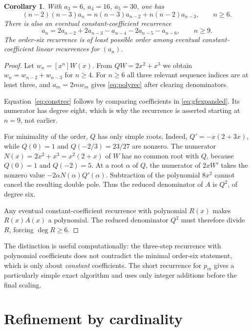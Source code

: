 \documentclass[11pt,letterpaper]{article}
\numberwithin{equation}{section}
\newtheorem{corollary}[theorem]{Corollary}
\theoremstyle{definition}
\theoremstyle{remark}
\begin{document}
\begin{corollary}\label{cor:recurrences}
With $a_3=6$, $a_4=16$, $a_5=30$, one has
\begin{equation}\label{eq:polyrec}
 (n-2)(n-3)a_n
 =n(n-3)a_{n-2}+n(n-2)a_{n-3},\qquad n\ge6.
\end{equation}
There is also an eventual constant-coefficient recurrence
\begin{equation}\label{eq:constrec}
 a_n=2a_{n-2}+2a_{n-3}-a_{n-4}-2a_{n-5}-a_{n-6},
 \qquad n\ge9.
\end{equation}
The order-six recurrence is of least possible order among eventual
constant-coefficient linear recurrences for $(a_n)$.
\end{corollary}
\begin{proof}
Let $w_n=[x^n]W(x)$. From $QW=2x^2+x^3$ we obtain
$w_n=w_{n-2}+w_{n-3}$ for $n\ge4$. For $n\ge6$ all three relevant
sequence indices are at least three, and $a_m=2mw_m$ gives
\eqref{eq:polyrec} after clearing denominators.

Equation~\eqref{eq:constrec} follows by comparing coefficients in
\eqref{eq:gfexpanded}. Its numerator has degree eight, which is
why the recurrence is asserted starting at $n=9$, not earlier.

For minimality of the order, $Q$ has only simple roots. Indeed,
$Q'=-x(2+3x)$, while $Q(0)=1$ and $Q(-2/3)=23/27$ are nonzero.
The numerator $N(x)=2x^2+x^3=x^2(2+x)$ of $W$ has no common root
with $Q$, because $Q(0)=1$ and $Q(-2)=5$. At a root $\alpha$ of
$Q$, the numerator of $2xW'$ takes the nonzero value
$-2\alpha N(\alpha)Q'(\alpha)$. Subtraction of the polynomial
$8x^2$ cannot cancel the resulting double pole. Thus the reduced
denominator of $A$ is $Q^2$, of degree six.

Any eventual constant-coefficient recurrence with polynomial
$R(x)$ makes $R(x)A(x)$ a polynomial. The reduced denominator
$Q^2$ must therefore divide $R$, forcing $\deg R\ge6$.
\end{proof}

The distinction is useful computationally: the three-step recurrence
with polynomial coefficients does not contradict the minimal
order-six statement, which is only about \emph{constant} coefficients.
The short recurrence for $p_m$ gives a particularly simple exact
algorithm and uses only integer additions before the final scaling.

\section{Refinement by cardinality}\label{sec:size}
\end{document}
